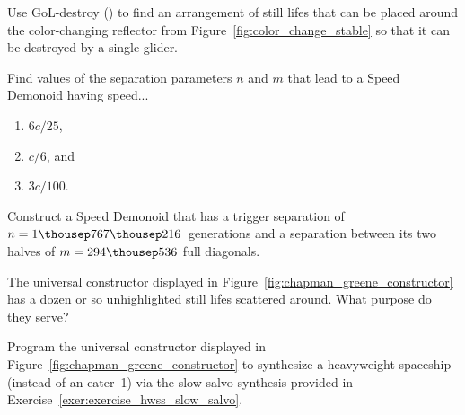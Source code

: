 \begin{multicols}{2}
	
	\mfilbreak
	
	
	\begin{problem}\label{exer:use_gol_destroy} 
		Use GoL-destroy () to find an arrangement of still lifes that can be placed around the color-changing reflector from Figure~\ref{fig:color_change_stable} so that it can be destroyed by a single glider.
	\end{problem}
	
	
	\mfilbreak
	
	
	\begin{problem}\label{exer:speed_demonoid_parameters} 
		Find values of the separation parameters $n$ and $m$ that lead to a Speed Demonoid having speed...
		
		\begin{enumerate}[label=\bf\color{ocre}(\alph*)]
			\item $6c/25$,
			
			\item $c/6$, and
			
			\item $3c/100$.
		\end{enumerate}
	\end{problem}
	
	
	\mfilbreak
	
	
	\begin{problem}\label{exer:3c14_speed_demonoid} 
		Construct a Speed Demonoid that has a trigger separation of $n = 1{\thousep}767{\thousep}216$~generations and a separation between its two halves of $m = 294{\thousep}536$ full diagonals.
		
	\end{problem}
	
	
	\mfilbreak
	
	
	\begin{problem}\label{exer:chapman_constructor_why_unhighlighted} 
		The universal constructor displayed in Figure~\ref{fig:chapman_greene_constructor} has a dozen or so unhighlighted still lifes scattered around. What purpose do they serve?
	\end{problem}
	
	
	\mfilbreak
	
	
	\begin{problem}\label{exer:chapman_constructor_make_hwss} 
		Program the universal constructor displayed in Figure~\ref{fig:chapman_greene_constructor} to synthesize a heavyweight spaceship (instead of an eater~1) via the slow salvo synthesis provided in Exercise~\ref{exer:exercise_hwss_slow_salvo}.
	\end{problem}
	

\end{multicols}
